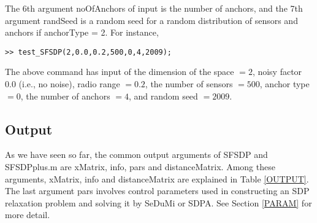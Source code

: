 \documentclass[12pt]{article}
\begin{document}
The 6th argument noOfAnchors of input is  the number of anchors, and the 7th argument
randSeed  is  a random seed  for a random distribution of sensors and
               anchors if anchorType = 2.
 For instance,
\begin{verbatim}
>> test_SFSDP(2,0.0,0.2,500,0,4,2009);
\end{verbatim}
The above command has input of the dimension of the space $=2$, noisy factor $0.0$ (i.e., no noise), 
radio range $=0.2$, the number of sensors $=500$, anchor type $=0$, the number of anchors $=4$, and random seed $=2009$.

\subsection{Output}

As we have seen so far, 
the common output arguments of SFSDP and SFSDPplus.m are xMatrix, info, pars and distanceMatrix. 
Among these arguments, xMatrix, info and distanceMatrix are explained in Table \ref{OUTPUT}. 
The last argument pars involves control parameters used 
in constructing an SDP relaxation problem 
and solving it by SeDuMi or SDPA. See Section \ref{PARAM} for more detail. 
\end{document}
